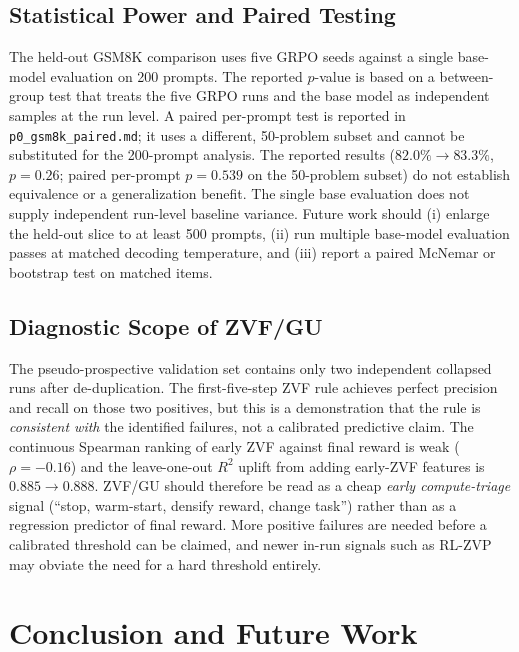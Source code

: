 \documentclass[12pt,a4paper]{report}
\begin{document}
\section*{Statistical Power and Paired Testing}
The held-out GSM8K comparison uses five GRPO seeds against a single base-model evaluation on 200 prompts. The reported $p$-value is based on a between-group test that treats the five GRPO runs and the base model as independent samples at the run level. A paired per-prompt test is reported in \texttt{p0\_gsm8k\_paired.md}; it uses a different, 50-problem subset and cannot be substituted for the 200-prompt analysis. The reported results ($82.0\%\to83.3\%$, $p=0.26$; paired per-prompt $p=0.539$ on the 50-problem subset) do not establish equivalence or a generalization benefit. The single base evaluation does not supply independent run-level baseline variance. Future work should (i) enlarge the held-out slice to at least 500 prompts, (ii) run multiple base-model evaluation passes at matched decoding temperature, and (iii) report a paired McNemar or bootstrap test on matched items.

\section*{Diagnostic Scope of ZVF/GU}
The pseudo-prospective validation set contains only two independent collapsed runs after de-duplication. The first-five-step ZVF rule achieves perfect precision and recall on those two positives, but this is a demonstration that the rule is \emph{consistent with} the identified failures, not a calibrated predictive claim. The continuous Spearman ranking of early ZVF against final reward is weak ($\rho=-0.16$) and the leave-one-out $R^2$ uplift from adding early-ZVF features is $0.885\!\to\!0.888$. ZVF/GU should therefore be read as a cheap \emph{early compute-triage} signal (``stop, warm-start, densify reward, change task'') rather than as a regression predictor of final reward. More positive failures are needed before a calibrated threshold can be claimed, and newer in-run signals such as RL-ZVP~\citep{liu2025rlzvp} may obviate the need for a hard threshold entirely.

\chapter{Conclusion and Future Work}
\label{ch:conclusion}
\end{document}
